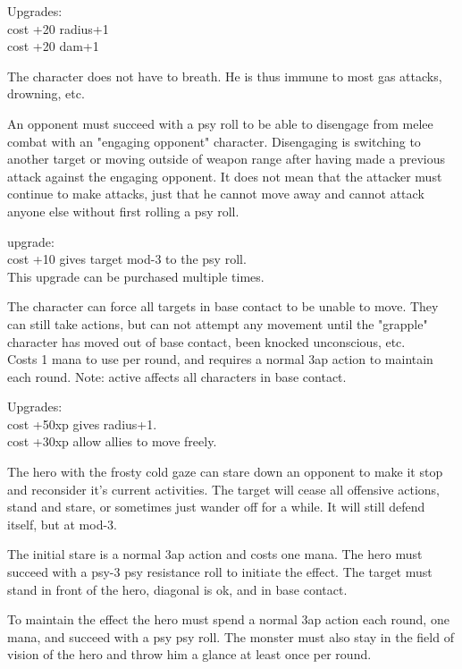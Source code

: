 Upgrades:\\
cost +20 radius+1 \\
cost +20 dam+1


 The character does not have to breath. He is thus immune to most gas attacks, drowning, etc.


 An opponent must succeed with a psy roll to be able to disengage from melee combat with an "engaging opponent" character. Disengaging is switching to another target or moving outside of weapon range after having made a previous attack against the engaging opponent. It does not mean that the attacker must continue to make attacks, just that he cannot move away and cannot attack anyone else without first rolling a psy roll.

upgrade: \\
cost +10 gives target mod-3 to the psy roll. \\
This upgrade can be purchased multiple times.


 The character can force all targets in base contact to be unable to move. They can still take actions, but can not attempt any movement until the "grapple" character has moved out of base contact, been knocked unconscious, etc. \\
Costs 1 mana to use per round, and requires a normal 3ap action to maintain each round. Note: active affects all characters in base contact.

Upgrades: \\
cost +50xp gives radius+1.\\
cost +30xp allow allies to move freely.


 The hero with the frosty cold gaze can stare down an opponent to make it stop and reconsider it's current activities. The target will cease all offensive actions, stand and stare, or sometimes just wander off for a while. It will still defend itself, but at mod-3.

The initial stare is a normal 3ap action and costs one mana. The hero must succeed with a psy-3 \vs psy resistance roll to initiate the effect. The target must stand in front of the hero, diagonal is ok, and in base contact.

To maintain the effect the hero must spend a normal 3ap action each round, one mana, and succeed with a psy \vs psy roll. The monster must also stay in the field of vision of the hero and throw him a glance at least once per round.

